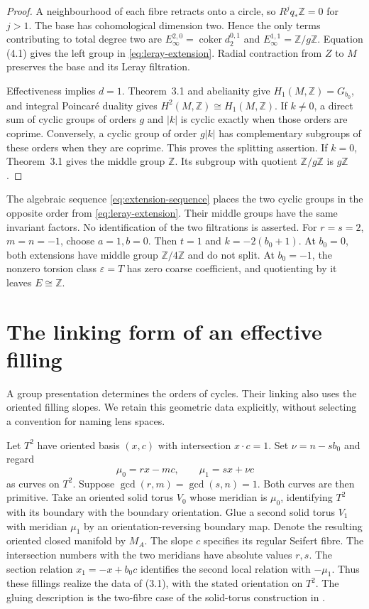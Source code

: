 \documentclass[11pt]{article}
\numberwithin{equation}{section}
\begin{document}
\begin{proof}
A neighbourhood of each fibre retracts onto a circle, so
$R^jq_*\mathbb Z=0$ for $j>1$.  The base has cohomological dimension
two.  Hence the only terms contributing to total degree two are
$E_\infty^{2,0}=\operatorname{coker}d_2^{0,1}$ and
$E_\infty^{1,1}=\mathbb Z/g\mathbb Z$.  Equation (4.1) gives the
left group in \eqref{eq:leray-extension}.  Radial contraction from $Z$
to $M$ preserves the base and its Leray filtration.

Effectiveness implies $d=1$.  Theorem~3.1 and abelianity give
$H_1(M,\mathbb Z)=G_{b_0}$, and integral Poincar\'e duality gives
$H^2(M,\mathbb Z)\cong H_1(M,\mathbb Z)$.
If $k\ne0$, a direct sum of cyclic groups of orders $g$ and $|k|$ is
cyclic exactly when those orders are coprime.  Conversely, a cyclic group
of order $g|k|$ has complementary subgroups of these orders when they
are coprime.  This proves the splitting assertion.
If $k=0$, Theorem~3.1 gives the middle group $\mathbb Z$.
Its subgroup with quotient $\mathbb Z/g\mathbb Z$ is $g\mathbb Z$.
\end{proof}

The algebraic sequence \eqref{eq:extension-sequence} places the two
cyclic groups in the opposite order from \eqref{eq:leray-extension}.
Their middle groups have the same invariant factors.  No identification
of the two filtrations is asserted.
For $r=s=2$, $m=n=-1$, choose $a=1,b=0$.  Then $t=1$ and
$k=-2(b_0+1)$.  At $b_0=0$, both extensions have middle group
$\mathbb Z/4\mathbb Z$ and do not split.
At $b_0=-1$, the nonzero torsion class $\varepsilon=T$ has zero
coarse coefficient, and quotienting by it leaves $E\cong\mathbb Z$.

\section{The linking form of an effective filling}

A group presentation determines the orders of cycles.  Their linking
also uses the oriented filling slopes.  We retain this geometric data
explicitly, without selecting a convention for naming lens spaces.

Let $T^2$ have oriented basis $(x,c)$ with intersection $x\cdot c=1$.
Set $\nu=n-sb_0$ and regard
\begin{equation}\label{eq:filling-slopes}
       \mu_0=rx-mc,\qquad \mu_1=sx+\nu c
\end{equation}
as curves on $T^2$.  Suppose
$\gcd(r,m)=\gcd(s,n)=1$.  Both curves are then primitive.
Take an oriented solid torus $V_0$ whose meridian is $\mu_0$, identifying
$T^2$ with its boundary with the boundary orientation.
Glue a second solid torus $V_1$ with meridian $\mu_1$ by an
orientation-reversing boundary map.  Denote the resulting oriented
closed manifold by $M_A$.
The slope $c$ specifies its regular Seifert fibre.  The intersection
numbers with the two meridians have absolute values $r,s$.
The section relation $x_1=-x+b_0c$ identifies the second local
relation with $-\mu_1$.  Thus these fillings realize the data of (3.1),
with the stated orientation on $T^2$.
The gluing description is the two-fibre case of the solid-torus
construction in \cite[Section~2.1, pp.~25--27]{Hatcher}.
\end{document}
